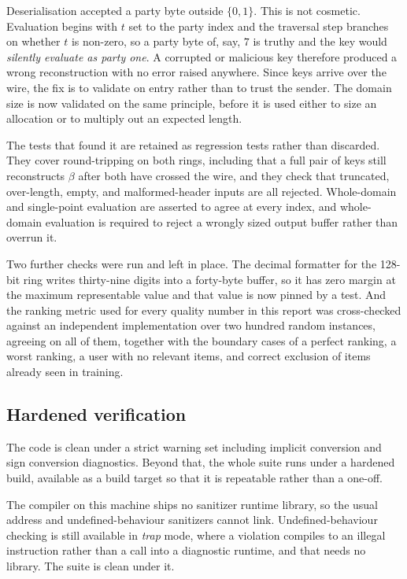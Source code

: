 Deserialisation accepted a party byte outside $\{0,1\}$. This is not cosmetic.
Evaluation begins with $t$ set to the party index and the traversal step
branches on whether $t$ is non-zero, so a party byte of, say, $7$ is truthy and
the key would \emph{silently evaluate as party one}. A corrupted or malicious
key therefore produced a wrong reconstruction with no error raised anywhere.
Since keys arrive over the wire, the fix is to validate on entry rather than to
trust the sender. The domain size is now validated on the same principle,
before it is used either to size an allocation or to multiply out an expected
length.

The tests that found it are retained as regression tests rather than discarded.
They cover round-tripping on both rings, including that a full pair of keys
still reconstructs $\beta$ after both have crossed the wire, and they check that
truncated, over-length, empty, and malformed-header inputs are all rejected.
Whole-domain and single-point evaluation are asserted to agree at every index,
and whole-domain evaluation is required to reject a wrongly sized output buffer
rather than overrun it.

Two further checks were run and left in place. The decimal formatter for the
128-bit ring writes thirty-nine digits into a forty-byte buffer, so it has zero
margin at the maximum representable value and that value is now pinned by a
test. And the ranking metric used for every quality number in this report was
cross-checked against an independent implementation over two hundred random
instances, agreeing on all of them, together with the boundary cases of a
perfect ranking, a worst ranking, a user with no relevant items, and correct
exclusion of items already seen in training.

\subsection{Hardened verification}
\label{sec:tech:dpf:hardening}

The code is clean under a strict warning set including implicit conversion and
sign conversion diagnostics. Beyond that, the whole suite runs under a hardened
build, available as a build target so that it is repeatable rather than a
one-off.

The compiler on this machine ships no sanitizer runtime library, so the usual
address and undefined-behaviour sanitizers cannot link. Undefined-behaviour
checking is still available in \emph{trap} mode, where a violation compiles to
an illegal instruction rather than a call into a diagnostic runtime, and that
needs no library. The suite is clean under it.

